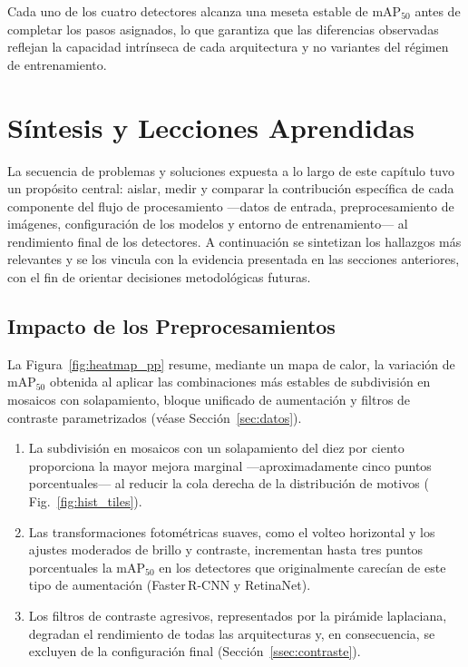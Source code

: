 Cada uno de los cuatro detectores alcanza una meseta estable de \(\text{mAP}_{50}\) antes de completar los pasos asignados, lo que garantiza que las diferencias observadas reflejan la capacidad intrínseca de cada arquitectura y no variantes del régimen de entrenamiento.

\section{Síntesis y Lecciones Aprendidas}\label{sec:sintesis}

La secuencia de problemas y soluciones expuesta a lo largo de este capítulo tuvo un propósito central:
aislar, medir y comparar la contribución específica de cada componente del flujo de procesamiento —datos de entrada, preprocesamiento de imágenes, configuración de los modelos y entorno de entrenamiento— al rendimiento final de los detectores.
A continuación se sintetizan los hallazgos más relevantes y se los vincula con la evidencia presentada en las secciones anteriores, con el fin de orientar decisiones metodológicas futuras.

\subsection{Impacto de los Preprocesamientos}

La Figura~\ref{fig:heatmap_pp} resume, mediante un mapa de calor, la variación de \(\text{mAP}_{50}\) obtenida al aplicar las combinaciones más estables de subdivisión en mosaicos con solapamiento, bloque unificado de aumentación y filtros de contraste parametrizados (véase Sección~\ref{sec:datos}).

\begin{enumerate}
  \item La subdivisión en mosaicos con un solapamiento del diez por ciento proporciona la mayor mejora marginal —aproximadamente cinco puntos porcentuales— al reducir la cola derecha de la distribución de motivos (\(\)Fig.~\ref{fig:hist_tiles}).
  \item Las transformaciones fotométricas suaves, como el volteo horizontal y los ajustes moderados de brillo y contraste, incrementan hasta tres puntos porcentuales la \(\text{mAP}_{50}\) en los detectores que originalmente carecían de este tipo de aumentación (Faster\,R-CNN y RetinaNet).
  \item Los filtros de contraste agresivos, representados por la pirámide laplaciana, degradan el rendimiento de todas las arquitecturas y, en consecuencia, se excluyen de la configuración final (Sección~\ref{ssec:contraste}).
\end{enumerate}

